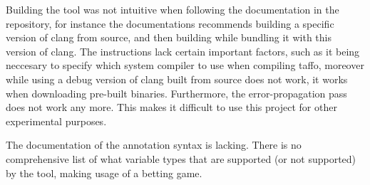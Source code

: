 Building the tool was not intuitive when following the documentation in the repository, for instance the documentations recommends building a specific version of clang from source, and then building \taffo{} while bundling it with this version of clang. The instructions lack certain important factors, such as it being neccesary to specify which system compiler to use when compiling taffo, moreover while using a debug version of clang built from source does not work, it works when downloading pre-built binaries.
Furthermore, the error-propagation pass does not work any more. This makes it difficult to use this project for other experimental purposes.

The documentation of the annotation syntax is lacking. There is no comprehensive list of what variable types that are supported (or not supported) by the tool, making usage of \taffo{} a betting game.